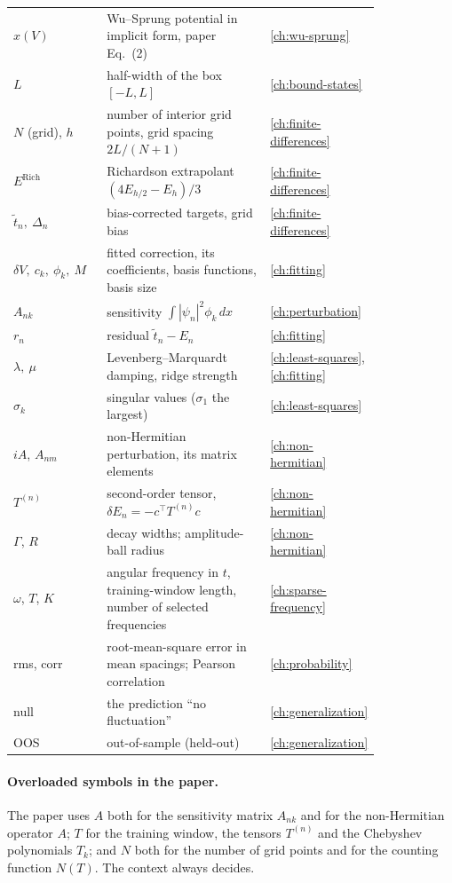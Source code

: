 \begin{center}
\begin{tabular}{p{0.27\linewidth}p{0.55\linewidth}l}
$x(V)$ & Wu--Sprung potential in implicit form, paper Eq.~(2) & \ref{ch:wu-sprung}\\
$L$ & half-width of the box $[-L,L]$ & \ref{ch:bound-states}\\
$N$ (grid), $h$ & number of interior grid points, grid spacing $2L/(N+1)$ & \ref{ch:finite-differences}\\
$E^{\mathrm{Rich}}$ & Richardson extrapolant $(4E_{h/2}-E_h)/3$ & \ref{ch:finite-differences}\\
$\tilde t_n,\ \Delta_n$ & bias-corrected targets, grid bias & \ref{ch:finite-differences}\\
$\delta V,\ c_k,\ \phi_k,\ M$ & fitted correction, its coefficients, basis functions, basis size & \ref{ch:fitting}\\
$A_{nk}$ & sensitivity $\int|\psi_n|^2\phi_k\,dx$ & \ref{ch:perturbation}\\
$r_n$ & residual $\tilde t_n-E_n$ & \ref{ch:fitting}\\
$\lambda,\ \mu$ & Levenberg--Marquardt damping, ridge strength & \ref{ch:least-squares}, \ref{ch:fitting}\\
$\sigma_k$ & singular values ($\sigma_1$ the largest) & \ref{ch:least-squares}\\
$iA$, $A_{nm}$ & non-Hermitian perturbation, its matrix elements & \ref{ch:non-hermitian}\\
$T^{(n)}$ & second-order tensor, $\delta E_n=-c^\top T^{(n)}c$ & \ref{ch:non-hermitian}\\
$\Gamma$, $R$ & decay widths; amplitude-ball radius & \ref{ch:non-hermitian}\\
$\omega$, $T$, $K$ & angular frequency in $t$, training-window length, number of selected frequencies & \ref{ch:sparse-frequency}\\
rms, corr & root-mean-square error in mean spacings; Pearson correlation & \ref{ch:probability}\\
null & the prediction ``no fluctuation'' & \ref{ch:generalization}\\
OOS & out-of-sample (held-out) & \ref{ch:generalization}\\
\bottomrule
\end{tabular}
\end{center}

\paragraph{Overloaded symbols in the paper.} The paper uses $A$ both for the sensitivity matrix $A_{nk}$ and for the non-Hermitian operator $A$; $T$ for the training window, the tensors $T^{(n)}$ and the Chebyshev polynomials $T_k$; and $N$ both for the number of grid points and for the counting function $N(T)$. The context always decides.

